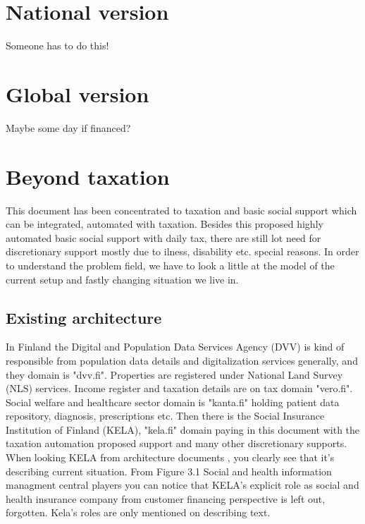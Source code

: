 \section{National version}
\label{implementation_national}
Someone has to do this!

\section{Global version}
\label{implementation_global}
Maybe some day if financed?

\section{Beyond taxation}
\label{beyond_taxation}
This document has been concentrated to taxation and basic social support
which can be integrated, automated with taxation.
Besides this proposed highly automated basic social support with daily tax,
there are still lot need for discretionary support mostly due to ilness,
disability etc. special reasons. In order to understand the problem field,
we have to look a little at the model of the current setup
and fastly changing situation we live in.

\subsection{Existing architecture}
\label{existing_architecture}

In Finland the Digital and Population Data Services Agency (DVV)
is kind of responsible from population data details
and digitalization services generally, and they domain is "dvv.fi".
Properties are registered under National Land Survey (NLS) services.
Income register and taxation details are on tax domain "vero.fi".
Social welfare and healthcare sector domain is "kanta.fi"
holding patient data repository, diagnosis, prescriptions etc.
Then there is the Social Insurance Institution of Finland (KELA),
"kela.fi" domain paying in this document with the taxation automation proposed support
and many other discretionary supports. When looking KELA from architecture documents \cite{SYPLJULK},
you clearly see that it's describing current situation.
From Figure 3.1 Social and health information managment central players \cite{SYPLJULK_Kuva_3.1}
you can notice that KELA's explicit role as social and health insurance company from customer financing perspective is left out, forgotten.
Kela's roles are only mentioned on describing text.

